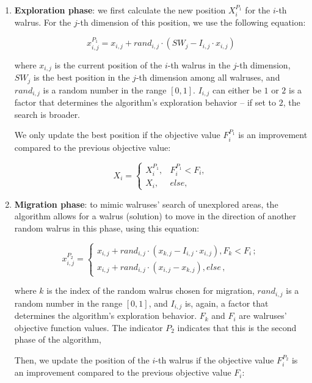 \documentclass{article}
\begin{document}
\begin{enumerate}
  \item \textbf{Exploration phase}: we first calculate the new
    position ${X}_{i}^{{P}_{1}}$ for the $i$-th walrus. For the $j$-th dimension
    of this position, we use the following equation:

    \[
      {x}_{i,j}^{P_1} = x_{i,j} + rand_{i,j} \cdot \left( SW_j -
      I_{i,j} \cdot x_{i,j} \right)
    \]

    where $x_{i,j}$ is the current position of the $i$-th walrus in
    the $j$-th dimension, $SW_j$ is the best position in the $j$-th
    dimension among all walruses, and $rand_{i,j}$ is a random number
    in the range $[0, 1]$. $I_{i,j}$ can either be $1$ or $2$ is a
    factor that determines the algorithm's exploration behavior -- if
    set to $2$, the search is broader.

    We only update the best position if the objective value
    $F_i^{P_1}$ is an improvement compared to the previous objective value:

    $$
    {X}_{i}=
    \begin{cases}{X}_{i}^{{P}_{1}}, &
      {F}_{i}^{{P}_{1}}<{F}_{i},\\ {X}_{i}, & else,
    \end{cases}
    $$

  \item \textbf{Migration phase}: to mimic walruses' search of unexplored areas,
    the algorithm allows for a walrus (solution) to move in the direction of
    another random walrus in this phase, using this equation:

    \[
      {x}_{i,j}^{{P}_{2}}=
      \begin{cases}
        {x}_{i,j}+{rand}_{i,j}\cdot \left({x}_{k,j}-{I}_{i,j}\cdot
        {x}_{i,j}\right), {F}_{k}<{F}_{i}\,;\\

        {x}_{i,j}+{rand}_{i,j}\cdot \left({x}_{i,j}-{x}_{k,j}\right), else\,,
      \end{cases}
    \]

    where $k$ is the index of the random walrus chosen for migration,
    $rand_{i,j}$ is a random number in the range $[0, 1]$, and
    $I_{i,j}$ is, again, a factor that determines the algorithm's
    exploration behavior. $F_k$ and $F_i$ are walruses' objective
    function values. The indicator $P_2$ indicates that this is the
    second phase of the algorithm,

    Then, we update the position of the $i$-th walrus if the
    objective value $F_i^{P_2}$ is an improvement compared to the
    previous objective value $F_i$:


\end{enumerate}
\end{document}

